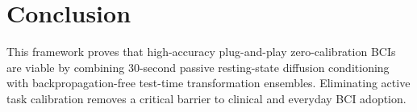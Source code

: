 \documentclass[journal,10pt]{IEEEtran}
\begin{document}
\section{Conclusion}
This framework proves that high-accuracy plug-and-play zero-calibration BCIs are viable by combining 30-second passive resting-state diffusion conditioning with backpropagation-free test-time transformation ensembles. Eliminating active task calibration removes a critical barrier to clinical and everyday BCI adoption.



\end{document}

